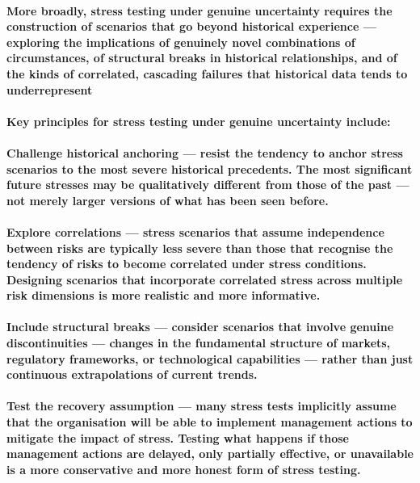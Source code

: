 \paragraph{More broadly, stress testing under genuine uncertainty requires the construction of scenarios that go beyond historical experience — exploring the implications of genuinely novel combinations of circumstances, of structural breaks in historical relationships, and of the kinds of correlated, cascading failures that historical data tends to underrepresent}
\paragraph{Key principles for stress testing under genuine uncertainty include:}
\paragraph{\textbf{Challenge historical anchoring} — resist the tendency to anchor stress scenarios to the most severe historical precedents. The most significant future stresses may be qualitatively different from those of the past — not merely larger versions of what has been seen before.}
\paragraph{\textbf{Explore correlations} — stress scenarios that assume independence between risks are typically less severe than those that recognise the tendency of risks to become correlated under stress conditions. Designing scenarios that incorporate correlated stress across multiple risk dimensions is more realistic and more informative.}
\paragraph{\textbf{Include structural breaks} — consider scenarios that involve genuine discontinuities — changes in the fundamental structure of markets, regulatory frameworks, or technological capabilities — rather than just continuous extrapolations of current trends.}
\paragraph{\textbf{Test the recovery assumption} — many stress tests implicitly assume that the organisation will be able to implement management actions to mitigate the impact of stress. Testing what happens if those management actions are delayed, only partially effective, or unavailable is a more conservative and more honest form of stress testing.}

